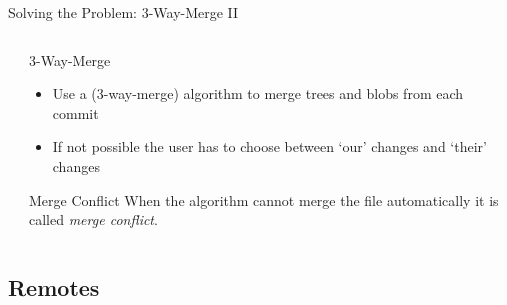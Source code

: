 \documentclass[xetex]{beamer}
\begin{document}
\begin{frame}[fragile]{Solving the Problem: 3-Way-Merge II}
\begin{columns}
\begin{column}{.55\linewidth}
    \end{column}
    \begin{column}{.45\linewidth}
      \begin{alertblock}{3-Way-Merge}
        \begin{itemize}
          \item Use a (3-way-merge) algorithm to merge trees and blobs from
            each commit

          \item If not possible the user has to choose between `our' changes
            and `their' changes
        \end{itemize}
      \end{alertblock}
      \begin{block}{Merge Conflict}
        When the algorithm cannot merge the file automatically it is called
        \emph{merge conflict}.
      \end{block}
    \end{column}
  \end{columns}
\end{frame}

\subsection{Remotes}
\end{document}
